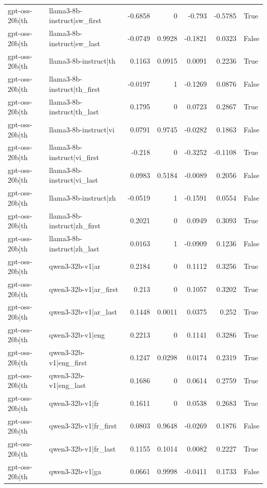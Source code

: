 \begin{table}
\begin{tabular}{l l r r r r l}
gpt-oss-20b|th & llama3-8b-instruct|sw_first & -0.6858 & 0 & -0.793 & -0.5785 & True \\
gpt-oss-20b|th & llama3-8b-instruct|sw_last & -0.0749 & 0.9928 & -0.1821 & 0.0323 & False \\
gpt-oss-20b|th & llama3-8b-instruct|th & 0.1163 & 0.0915 & 0.0091 & 0.2236 & True \\
gpt-oss-20b|th & llama3-8b-instruct|th_first & -0.0197 & 1 & -0.1269 & 0.0876 & False \\
gpt-oss-20b|th & llama3-8b-instruct|th_last & 0.1795 & 0 & 0.0723 & 0.2867 & True \\
gpt-oss-20b|th & llama3-8b-instruct|vi & 0.0791 & 0.9745 & -0.0282 & 0.1863 & False \\
gpt-oss-20b|th & llama3-8b-instruct|vi_first & -0.218 & 0 & -0.3252 & -0.1108 & True \\
gpt-oss-20b|th & llama3-8b-instruct|vi_last & 0.0983 & 0.5184 & -0.0089 & 0.2056 & False \\
gpt-oss-20b|th & llama3-8b-instruct|zh & -0.0519 & 1 & -0.1591 & 0.0554 & False \\
gpt-oss-20b|th & llama3-8b-instruct|zh_first & 0.2021 & 0 & 0.0949 & 0.3093 & True \\
gpt-oss-20b|th & llama3-8b-instruct|zh_last & 0.0163 & 1 & -0.0909 & 0.1236 & False \\
gpt-oss-20b|th & qwen3-32b-v1|ar & 0.2184 & 0 & 0.1112 & 0.3256 & True \\
gpt-oss-20b|th & qwen3-32b-v1|ar_first & 0.213 & 0 & 0.1057 & 0.3202 & True \\
gpt-oss-20b|th & qwen3-32b-v1|ar_last & 0.1448 & 0.0011 & 0.0375 & 0.252 & True \\
gpt-oss-20b|th & qwen3-32b-v1|eng & 0.2213 & 0 & 0.1141 & 0.3286 & True \\
gpt-oss-20b|th & qwen3-32b-v1|eng_first & 0.1247 & 0.0298 & 0.0174 & 0.2319 & True \\
gpt-oss-20b|th & qwen3-32b-v1|eng_last & 0.1686 & 0 & 0.0614 & 0.2759 & True \\
gpt-oss-20b|th & qwen3-32b-v1|fr & 0.1611 & 0 & 0.0538 & 0.2683 & True \\
gpt-oss-20b|th & qwen3-32b-v1|fr_first & 0.0803 & 0.9648 & -0.0269 & 0.1876 & False \\
gpt-oss-20b|th & qwen3-32b-v1|fr_last & 0.1155 & 0.1014 & 0.0082 & 0.2227 & True \\
gpt-oss-20b|th & qwen3-32b-v1|ga & 0.0661 & 0.9998 & -0.0411 & 0.1733 & False \\

\end{tabular}
\end{table}
